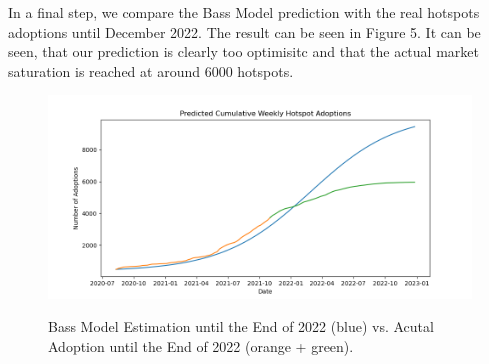 \documentclass{article}
\begin{document}
\noindent In a final step, we compare the Bass Model prediction with the real hotspots adoptions until December 2022. The result can be seen in Figure 5. It can be seen, that our
prediction is clearly too optimisitc and that the actual market saturation is reached at around $6000$ hotspots.

\begin{figure}[!hptb]
    \centering{}\includegraphics[scale=0.6]{plots/predicted_cumulative_weekly_hotspot_adoptions.png}\\
    \caption{Bass Model Estimation until the End of 2022 (blue) vs. Acutal Adoption until the End of 2022 (orange + green).}
\end{figure}


 
\end{document}
